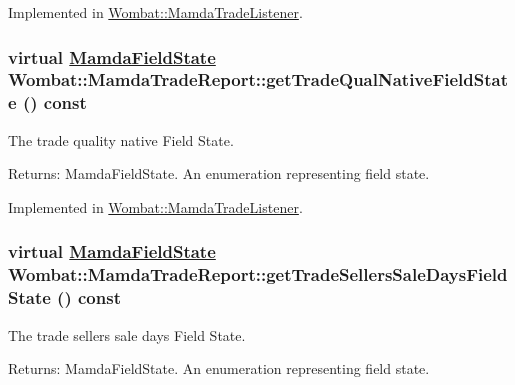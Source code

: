 Implemented in \hyperlink{classWombat_1_1MamdaTradeListener_958ea55776c3afa0a572b8819d9c04c8}{Wombat::Mamda\-Trade\-Listener}.\hypertarget{classWombat_1_1MamdaTradeReport_871557683cafde19e08e1a2e5c6f1f42}{
\subsubsection[getTradeQualNativeFieldState]{\setlength{\rightskip}{0pt plus 5cm}virtual \hyperlink{namespaceWombat_93aac974f2ab713554fd12a1fa3b7d2a}{Mamda\-Field\-State} Wombat::Mamda\-Trade\-Report::get\-Trade\-Qual\-Native\-Field\-State () const}}
\label{classWombat_1_1MamdaTradeReport_871557683cafde19e08e1a2e5c6f1f42}


The trade quality native Field State. 

\begin{Desc}
\item[Returns:]Mamda\-Field\-State. An enumeration representing field state. \end{Desc}


Implemented in \hyperlink{classWombat_1_1MamdaTradeListener_2e60dd06819139125a4812e84d5803c0}{Wombat::Mamda\-Trade\-Listener}.\hypertarget{classWombat_1_1MamdaTradeReport_da39a0b22fe34276bbf3fb4eefe510d3}{
\subsubsection[getTradeSellersSaleDaysFieldState]{\setlength{\rightskip}{0pt plus 5cm}virtual \hyperlink{namespaceWombat_93aac974f2ab713554fd12a1fa3b7d2a}{Mamda\-Field\-State} Wombat::Mamda\-Trade\-Report::get\-Trade\-Sellers\-Sale\-Days\-Field\-State () const}}
\label{classWombat_1_1MamdaTradeReport_da39a0b22fe34276bbf3fb4eefe510d3}


The trade sellers sale days Field State. 

\begin{Desc}
\item[Returns:]Mamda\-Field\-State. An enumeration representing field state. \end{Desc}


